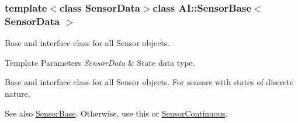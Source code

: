 \subsubsection*{template$<$class Sensor\+Data$>$class A\+I\+::\+Sensor\+Base$<$ Sensor\+Data $>$}

Base and interface class for all Sensor objects. 


\begin{DoxyTemplParams}{Template Parameters}
{\em Sensor\+Data} & State data type.\\
\hline
\end{DoxyTemplParams}
Base and interface class for all Sensor objects. For sensors with states of discrete nature, \begin{DoxySeeAlso}{See also}
\hyperlink{classAI_1_1SensorBase}{Sensor\+Base}. Otherwise, use this or \hyperlink{namespaceAI_a7ceaa7caf6e3bf156b8d2ab429d981b8}{Sensor\+Continuous}. 
\end{DoxySeeAlso}


